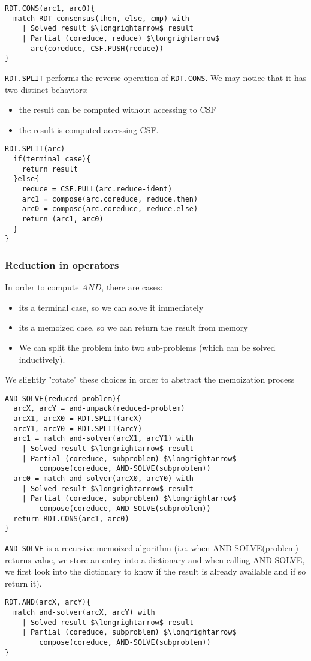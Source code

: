 \documentclass[a4paper,10pt]{article}
\begin{document}
\begin{lstlisting}
RDT.CONS(arc1, arc0){
  match RDT-consensus(then, else, cmp) with
    | Solved result $\longrightarrow$ result
    | Partial (coreduce, reduce) $\longrightarrow$
      arc(coreduce, CSF.PUSH(reduce))
}
\end{lstlisting}

\texttt{RDT.SPLIT} performs the reverse operation of \texttt{RDT.CONS}. We may notice that it has two distinct behaviors:\begin{itemize}
  \item the result can be computed without accessing to CSF
  \item the result is computed accessing CSF.
\end{itemize}

\begin{lstlisting}
RDT.SPLIT(arc)
  if(terminal case){
    return result
  }else{
    reduce = CSF.PULL(arc.reduce-ident)
    arc1 = compose(arc.coreduce, reduce.then)
    arc0 = compose(arc.coreduce, reduce.else)
    return (arc1, arc0)
  }
}
\end{lstlisting}
\subsubsection{Reduction in operators}

In order to compute $AND$, there are cases:\begin{itemize}
  \item its a terminal case, so we can solve it immediately
  \item its a memoized case, so we can return the result from memory
  \item We can split the problem into two sub-problems (which can be solved inductively).
\end{itemize}
We slightly "rotate" these choices in order to abstract the memoization process

\begin{lstlisting}
AND-SOLVE(reduced-problem){
  arcX, arcY = and-unpack(reduced-problem)
  arcX1, arcX0 = RDT.SPLIT(arcX)
  arcY1, arcY0 = RDT.SPLIT(arcY)
  arc1 = match and-solver(arcX1, arcY1) with
    | Solved result $\longrightarrow$ result
    | Partial (coreduce, subproblem) $\longrightarrow$
    	compose(coreduce, AND-SOLVE(subproblem))
  arc0 = match and-solver(arcX0, arcY0) with
    | Solved result $\longrightarrow$ result
    | Partial (coreduce, subproblem) $\longrightarrow$
    	compose(coreduce, AND-SOLVE(subproblem))
  return RDT.CONS(arc1, arc0)
}
\end{lstlisting}
\texttt{AND-SOLVE} is a recursive memoized algorithm (i.e. when AND-SOLVE(problem) returns value, we store an entry into a dictionary and when calling AND-SOLVE, we first look into the dictionary to know if the result is already available and if so return it).
\begin{lstlisting}
RDT.AND(arcX, arcY){
  match and-solver(arcX, arcY) with
    | Solved result $\longrightarrow$ result
    | Partial (coreduce, subproblem) $\longrightarrow$
    	compose(coreduce, AND-SOLVE(subproblem))
}
\end{lstlisting}
\end{document}
